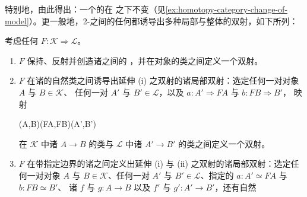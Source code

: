 特别地，由此得出：一个\trInfinityCategory{}的\trHomotopyCategory{}在%
\trChangeOfModel{}之下不变（见\cref{ex:homotopy-category-change-of-model}）。更一般地，2-\trCategory{}之间的任何\trBiequivalence{}都诱导出多种局部与整体的双射，如下所列：

\begin{corollary}\label{cor:biequivalence-local-bijections}
考虑任何\trCosmologicalBiequivalence{} $F\colon\mathcal{K}\Rightarrow\mathcal{L}$。
\begin{enumerate}[label=(\roman*)]
\item \trBiequivalence{} $F$ 保持、反射并创造诸\trInfinityCategory{}之间的%
  \trEquivalence，并在对象的\trEquivalence{}类之间定义一个双射。
\item \trBiequivalence{} $F$ 在诸\trFunctor{}的自然\trIsomorphism{}类之间诱导出延伸 (i) 之双射的诸局部双射：选定任何一对对象 $A$ 与 $B\in\mathcal{K}$、
  任何一对 $A'$ 与 $B'\in\mathcal{L}$，以及\trEquivalence
  $a\colon A'\Rightarrow FA$ 与 $b\colon FB\Rightarrow B'$，
  映射
  \begin{rveq}\label{eq:homotopy-categories-map}
  \hFun(A,B)\Rightarrow\hFun(FA,FB)\Rightarrow\hFun(A',B')
  \end{rveq}
  在 $\mathcal{K}$ 中诸\trFunctor{} $A\to B$ 的\trIsomorphism{}类与
  $\mathcal{L}$ 中诸\trFunctor{} $A'\to B'$ 的\trIsomorphism{}类之间定义一个双射。
\item \trBiequivalence{} $F$ 在带指定边界的诸\trNaturalTransformation{}之间定义出延伸 (i) 与 (ii) 之双射的诸局部双射：选定任何一对对象 $A$ 与
  $B\in\mathcal{K}$、任何一对 $A'$ 与 $B'\in\mathcal{L}$、指定的\trEquivalence
  $a\colon A'\simeq FA$ 与 $b\colon FB\simeq B'$、
  诸\trFunctor{} $f$ 与 $g\colon A\to B$ 以及 $f'$ 与 $g'\colon A'\to B'$，还有自然\trIsomorphism
  \begin{center}
\end{center}
\end{enumerate}
\end{corollary}
